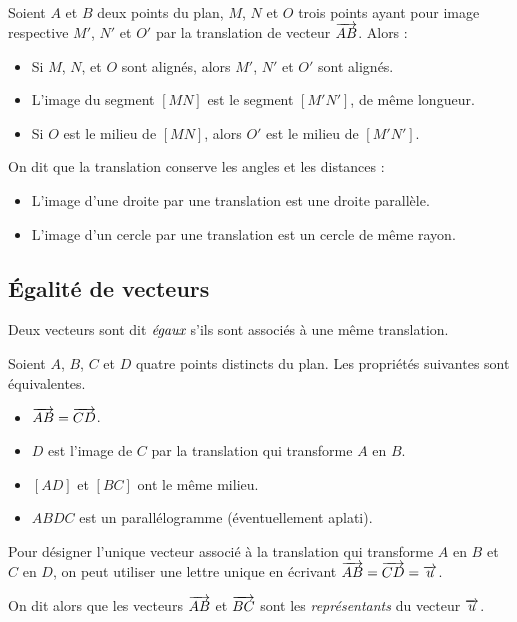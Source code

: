 \begin{propriete}
  Soient $A$ et $B$ deux points du plan, $M$, $N$ et $O$ trois points ayant pour image respective $M'$, $N'$ et $O'$ par la translation de vecteur $\overrightarrow{AB}$. Alors :
  \begin{itemize}
    \item Si $M$, $N$, et $O$ sont alignés, alors $M'$, $N'$ et $O'$ sont alignés.
    \item L'image du segment $[MN]$ est le segment $[M'N']$, de même longueur.
    \item Si $O$ est le milieu de $[MN]$, alors $O'$ est le milieu de $[M'N']$.
  \end{itemize}

  On dit que la translation conserve les angles et les distances :

  \begin{itemize}
    \item L'image d'une droite par une translation est une droite parallèle.
    \item L'image d'un cercle par une translation est un cercle de même rayon.
  \end{itemize}
\end{propriete}

\subsection{Égalité de vecteurs}

\begin{definition}
  Deux vecteurs sont dit $\emph{égaux}$ s'ils sont associés à une même translation.
\end{definition}

\begin{propriete}
  Soient $A$, $B$, $C$ et $D$ quatre points distincts du plan. Les propriétés suivantes sont équivalentes.
  \begin{itemize}[$\bullet$]
    \item $\overrightarrow{AB}=\overrightarrow{CD}$.
    \item $D$ est l'image de $C$ par la translation qui transforme $A$ en $B$.
    \item $[AD]$ et $[BC]$ ont le même milieu.
    \item $ABDC$ est un parallélogramme (éventuellement aplati).
  \end{itemize}
\end{propriete}

\begin{definition}
  Pour désigner l'unique vecteur associé à la translation qui transforme $A$ en $B$ et $C$ en $D$, on peut utiliser une lettre unique en écrivant $\overrightarrow{AB}=\overrightarrow{CD}=\overrightarrow{u}$.

  On dit alors que les vecteurs $\overrightarrow{AB}$ et $\overrightarrow{BC}$ sont les \emph{représentants} du vecteur $\overrightarrow{u}$.
\end{definition}

